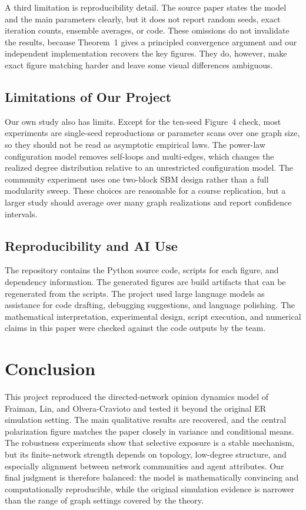 \documentclass[11pt]{article}
\begin{document}
A third limitation is reproducibility detail.  The source paper states the
model and the main parameters clearly, but it does not report random seeds,
exact iteration counts, ensemble averages, or code.  These omissions do not
invalidate the results, because Theorem~1 gives a principled convergence
argument and our independent implementation recovers the key figures.  They do,
however, make exact figure matching harder and leave some visual differences
ambiguous.

\subsection{Limitations of Our Project}

Our own study also has limits.  Except for the ten-seed Figure~4 check, most
experiments are single-seed reproductions or parameter scans over one graph
size, so they should not be read as asymptotic empirical laws.  The power-law
configuration model removes
self-loops and multi-edges, which changes the realized degree distribution
relative to an unrestricted configuration model.  The community experiment uses
one two-block SBM design rather than a full modularity sweep.  These choices are
reasonable for a course replication, but a larger study should average over
many graph realizations and report confidence intervals.

\subsection{Reproducibility and AI Use}

The repository contains the Python source code, scripts for each figure, and
dependency information.  The generated figures are build artifacts that can be
regenerated from the scripts.
The project used large language models as assistance for code drafting,
debugging suggestions, and language polishing.  The mathematical
interpretation, experimental design, script execution, and numerical claims in
this paper were checked against the code outputs by the team.

\section{Conclusion}
\label{sec:conclusion}

This project reproduced the directed-network opinion dynamics model of
Fraiman, Lin, and Olvera-Cravioto and tested it beyond the original ER
simulation setting.  The main qualitative results are recovered, and the
central polarization figure matches the paper closely in variance and
conditional means.  The robustness experiments show that selective exposure is
a stable mechanism, but its finite-network strength depends on topology,
low-degree structure, and especially alignment between network communities and
agent attributes.  Our final judgment is therefore balanced: the model is
mathematically convincing and computationally reproducible, while the original
simulation evidence is narrower than the range of graph settings covered by the
theory.
\end{document}
